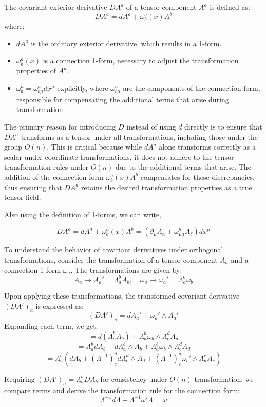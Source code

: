 \documentclass{article}
\begin{document}
The covariant exterior derivative \(DA^a\) of a tensor component \(A^a\) is defined as:
\[
DA^a = dA^a + \omega^a_b(x) A^b
\]
where:
\begin{itemize}
    \item \(dA^a\) is the ordinary exterior derivative, which results in a 1-form.
    \item \(\omega^a_b(x)\) is a connection 1-form, necessary to adjust the transformation properties of \(A^a\).
    \item \(\omega^a_b = \omega^a_{b\mu} dx^\mu\) explicitly, where \(\omega^a_{b\mu}\) are the components of the connection form, responsible for compensating the additional terms that arise during transformation.
\end{itemize}

The primary reason for introducing \(D\) instead of using \(d\) directly is to ensure that \(DA^a\) transforms as a tensor under all transformations, including those under the group \(O(n)\). This is critical because while \(dA^a\) alone transforms correctly as a scalar under coordinate transformations, it does not adhere to the tensor transformation rules under \(O(n)\) due to the additional terms that arise. The addition of the connection form \(\omega^a_b(x) A^b\) compensates for these discrepancies, thus ensuring that \(DA^a\) retains the desired transformation properties as a true tensor field. 

Also using the definition of 1-forms, we can write, 

\[
DA^a = dA^a + \omega^a_b(x) A^b = ( \partial_\mu A_a + \omega_{\mu a}^b A_\delta ) dx^\mu
\]

To understand the behavior of covariant derivatives under orthogonal transformations, consider the transformation of a tensor component \(A_a\) and a connection 1-form \(\omega_a\). The transformations are given by:
\[
A_a \rightarrow A_a' = \Lambda_a^b A_b, \quad \omega_a \rightarrow \omega_a' = \Lambda_a^b \omega_b
\]

Upon applying these transformations, the transformed covariant derivative \((DA')_a\) is expressed as:
\[
(DA')_a = dA_a' + \omega_a' \wedge A_a'
\]
Expanding each term, we get:
\[
= d(\Lambda_a^b A_b) + \Lambda_a^b \omega_b \wedge \Lambda_c^d A_d
\]
\[
= \Lambda_a^b dA_b + d\Lambda_a^b \wedge A_b + \Lambda_a^b \omega_b \wedge \Lambda_c^d A_d
\]
\[
= \Lambda_a^b \left( dA_b + (\Lambda^{-1})_c^d d\Lambda_c^d \wedge A_d + (\Lambda^{-1})_c^d \omega_c' \wedge \Lambda_d^e A_e \right)
\]

Requiring \((DA')_a = \Lambda_a^b D A_b\) for consistency under \(O(n)\) transformation, we compare terms and derive the transformation rule for the connection form:
\[
\Lambda^{-1} d\Lambda + \Lambda^{-1} \omega' \Lambda = \omega
\]
\end{document}
